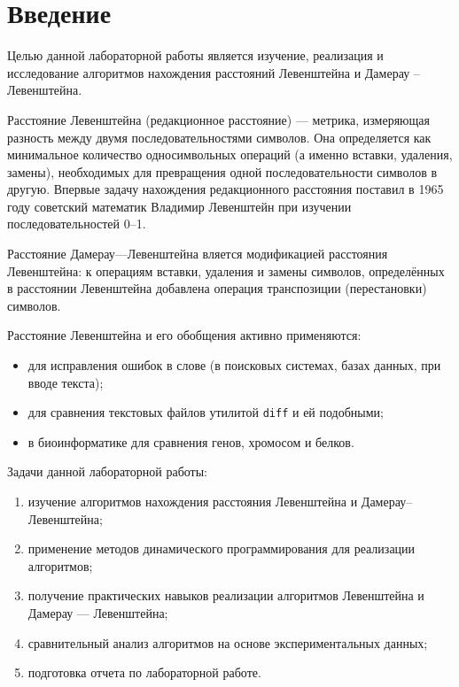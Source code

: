 \chapter*{Введение}

Целью данной лабораторной работы является изучение, реализация и исследование алгоритмов нахождения расстояний Левенштейна и Дамерау – Левенштейна.

Расстояние Левенштейна (редакционное расстояние) — метрика, измеряющая разность между двумя последовательностями символов. Она определяется как минимальное количество односимвольных операций (а именно вставки, удаления, замены), необходимых для превращения одной последовательности символов в другую. Впервые задачу нахождения редакционного расстояния поставил в 1965 году советский математик Владимир Левенштейн при изучении последовательностей 0–1\cite{Levenshtein}.

Расстояние Дамерау—Левенштейна вляется модификацией расстояния Левенштейна: к операциям вставки, удаления и замены символов, определённых в расстоянии Левенштейна добавлена операция транспозиции (перестановки) символов.

Расстояние Левенштейна и его обобщения активно применяются:
\begin{itemize}
	\item для исправления ошибок в слове (в поисковых системах, базах данных, при вводе текста);
	\item для сравнения текстовых файлов утилитой \texttt{diff} и ей подобными;
	\item в биоинформатике для сравнения генов, хромосом и белков.
\end{itemize}


Задачи данной лабораторной работы:
\begin{enumerate}
  	\item изучение алгоритмов нахождения расстояния Левенштейна и Дамерау--Левенштейна;
  	\item применение методов динамического программирования для реализации алгоритмов;
	\item получение практических навыков реализации алгоритмов Левенштейна и Дамерау — Левенштейна;
	\item сравнительный анализ алгоритмов на основе экспериментальных данных;
	\item подготовка отчета по лабораторной работе.
\end{enumerate}